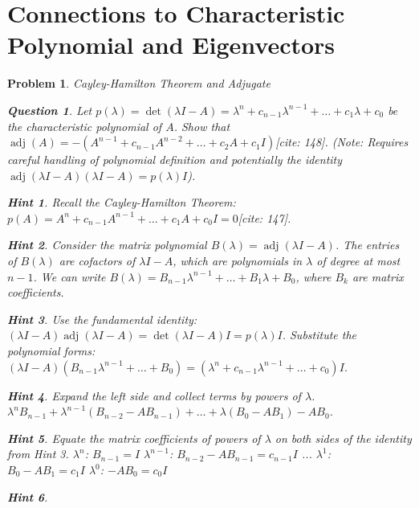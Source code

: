 \documentclass[12pt]{article}
\newtheorem{problem}{Problem}[section]
\newtheorem{question}{Question}[problem]
\theoremstyle{definition}
\newtheorem{hint}{Hint}[question]
\newcommand{\adj}{\operatorname{adj}}
\newcommand{\detm}{\operatorname{det}}
\begin{document}
\section{Connections to Characteristic Polynomial and Eigenvectors}

\begin{problem}{Cayley-Hamilton Theorem and Adjugate}
    \begin{question}
        Let $p(\lambda) = \detm(\lambda I - A) = \lambda^n + c_{n-1}\lambda^{n-1} + \dots + c_1\lambda + c_0$ be the characteristic polynomial of $A$. Show that $\adj(A) = - (A^{n-1} + c_{n-1}A^{n-2} + \dots + c_2 A + c_1 I)$[cite: 148].
        \textit{(Note: Requires careful handling of polynomial definition and potentially the identity $\adj(\lambda I - A)(\lambda I - A) = p(\lambda)I$)}.
    \end{question}
    \begin{hint}
        Recall the Cayley-Hamilton Theorem: $p(A) = A^n + c_{n-1}A^{n-1} + \dots + c_1 A + c_0 I = 0$[cite: 147].
    \end{hint}
    \begin{hint}
        Consider the matrix polynomial $B(\lambda) = \adj(\lambda I - A)$. The entries of $B(\lambda)$ are cofactors of $\lambda I - A$, which are polynomials in $\lambda$ of degree at most $n-1$. We can write $B(\lambda) = B_{n-1}\lambda^{n-1} + \dots + B_1 \lambda + B_0$, where $B_k$ are matrix coefficients.
    \end{hint}
    \begin{hint}
        Use the fundamental identity: $(\lambda I - A) \adj(\lambda I - A) = \detm(\lambda I - A) I = p(\lambda) I$.
        Substitute the polynomial forms: $(\lambda I - A) (B_{n-1}\lambda^{n-1} + \dots + B_0) = (\lambda^n + c_{n-1}\lambda^{n-1} + \dots + c_0) I$.
    \end{hint}
    \begin{hint}
        Expand the left side and collect terms by powers of $\lambda$.
        $\lambda^n B_{n-1} + \lambda^{n-1}(B_{n-2} - A B_{n-1}) + \dots + \lambda(B_0 - A B_1) - A B_0$.
    \end{hint}
    \begin{hint}
        Equate the matrix coefficients of powers of $\lambda$ on both sides of the identity from Hint 3.
        $\lambda^n$: $B_{n-1} = I$
        $\lambda^{n-1}$: $B_{n-2} - A B_{n-1} = c_{n-1} I$
        ...
        $\lambda^1$: $B_0 - A B_1 = c_1 I$
        $\lambda^0$: $-A B_0 = c_0 I$
    \end{hint}
    \begin{hint}

\end{hint}
\end{problem}
\end{document}
